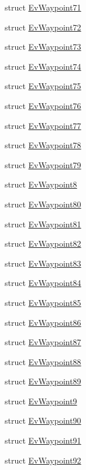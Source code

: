 \begin{DoxyCompactItemize}
\item 
struct \hyperlink{structsmacc_1_1EvWaypoint71}{Ev\+Waypoint71}
\item 
struct \hyperlink{structsmacc_1_1EvWaypoint72}{Ev\+Waypoint72}
\item 
struct \hyperlink{structsmacc_1_1EvWaypoint73}{Ev\+Waypoint73}
\item 
struct \hyperlink{structsmacc_1_1EvWaypoint74}{Ev\+Waypoint74}
\item 
struct \hyperlink{structsmacc_1_1EvWaypoint75}{Ev\+Waypoint75}
\item 
struct \hyperlink{structsmacc_1_1EvWaypoint76}{Ev\+Waypoint76}
\item 
struct \hyperlink{structsmacc_1_1EvWaypoint77}{Ev\+Waypoint77}
\item 
struct \hyperlink{structsmacc_1_1EvWaypoint78}{Ev\+Waypoint78}
\item 
struct \hyperlink{structsmacc_1_1EvWaypoint79}{Ev\+Waypoint79}
\item 
struct \hyperlink{structsmacc_1_1EvWaypoint8}{Ev\+Waypoint8}
\item 
struct \hyperlink{structsmacc_1_1EvWaypoint80}{Ev\+Waypoint80}
\item 
struct \hyperlink{structsmacc_1_1EvWaypoint81}{Ev\+Waypoint81}
\item 
struct \hyperlink{structsmacc_1_1EvWaypoint82}{Ev\+Waypoint82}
\item 
struct \hyperlink{structsmacc_1_1EvWaypoint83}{Ev\+Waypoint83}
\item 
struct \hyperlink{structsmacc_1_1EvWaypoint84}{Ev\+Waypoint84}
\item 
struct \hyperlink{structsmacc_1_1EvWaypoint85}{Ev\+Waypoint85}
\item 
struct \hyperlink{structsmacc_1_1EvWaypoint86}{Ev\+Waypoint86}
\item 
struct \hyperlink{structsmacc_1_1EvWaypoint87}{Ev\+Waypoint87}
\item 
struct \hyperlink{structsmacc_1_1EvWaypoint88}{Ev\+Waypoint88}
\item 
struct \hyperlink{structsmacc_1_1EvWaypoint89}{Ev\+Waypoint89}
\item 
struct \hyperlink{structsmacc_1_1EvWaypoint9}{Ev\+Waypoint9}
\item 
struct \hyperlink{structsmacc_1_1EvWaypoint90}{Ev\+Waypoint90}
\item 
struct \hyperlink{structsmacc_1_1EvWaypoint91}{Ev\+Waypoint91}
\item 
struct \hyperlink{structsmacc_1_1EvWaypoint92}{Ev\+Waypoint92}

\end{DoxyCompactItemize}
